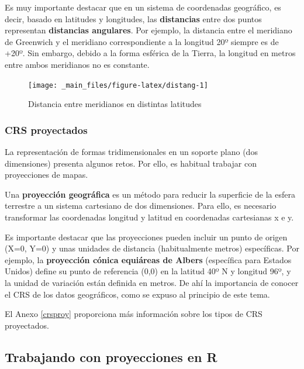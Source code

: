 \documentclass[
]{book}
\begin{document}
Es muy importante destacar que en un sistema de coordenadas geográfico, es
decir, basado en latitudes y longitudes, las \textbf{distancias} entre dos puntos
representan \textbf{distancias angulares}. Por ejemplo, la distancia entre el
meridiano de Greenwich y el meridiano correspondiente a la longitud 20º siempre
es de +20º. Sin embargo, debido a la forma esférica de la Tierra, la longitud en
metros entre ambos meridianos no es constante.

\begin{figure}

{\centering \texttt{[image: \_main\_files/figure-latex/distang-1]} 

}

\caption{Distancia entre meridianos en distintas latitudes}\label{fig:distang}
\end{figure}

\hypertarget{crs-proyectados}{%
\subsubsection{CRS proyectados}\label{crs-proyectados}}

La representación de formas tridimensionales en un soporte plano (dos
dimensiones) presenta algunos retos. Por ello, es habitual trabajar con
proyecciones de mapas.

Una \textbf{proyección geográfica} es un método para reducir la superficie de la
esfera terrestre a un sistema cartesiano de dos dimensiones. Para ello, es
necesario transformar las coordenadas longitud y latitud en coordenadas
cartesianas x e y.

Es importante destacar que las proyecciones pueden incluir un punto de origen
(X=0, Y=0) y unas unidades de distancia (habitualmente metros) específicas. Por
ejemplo, la \textbf{proyección cónica equiáreas de Albers} (específica para Estados
Unidos) define su punto de referencia (0,0) en la latitud 40º N y longitud 96º,
y la unidad de variación están definida en metros. De ahí la importancia de
conocer el CRS de los datos geográficos, como se expuso al principio de este
tema.

El Anexo \ref{crsproy} proporciona más información sobre los tipos de CRS
proyectados.

\hypertarget{trabajando-con-proyecciones-en-r}{%
\subsection{Trabajando con proyecciones en R}\label{trabajando-con-proyecciones-en-r}}
\end{document}
